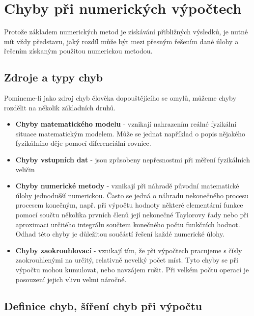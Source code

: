 {  %
  \section{Chyby při numerických výpočtech}
    Protože základem numerických metod je získávání přibližných výsledků, je nutné mít vždy
    představu, jaký rozdíl může být mezi přesným řešením dané úlohy a řešením získaným použitou
    numerickou metodou.
    \subsection{Zdroje a typy chyb}
      Pomineme-li jako zdroj chyb člověka dopouštějícího se omylů, můžeme chyby rozdělit na několik
      základních druhů.
      \begin{itemize}
        \item \textbf{Chyby matematického modelu} - vznikají nahrazením reálné fyzikální situace
              matematickým modelem. Může se jednat například o popis nějakého fyzikálního děje 
              pomocí diferenciální rovnice.
        \item \textbf{Chyby vstupních dat} - jsou způsobeny nepřesnostmi při měření fyzikálních
              veličin
        \item \textbf{Chyby numerické metody} - vznikají při náhradě původní matematické úlohy
              jednodušší numerickou. Často se jedná o náhradu nekonečného procesu procesem konečným,
              např. při výpočtu hodnoty některé elementární funkce pomocí součtu několika prvních
              členů její nekonečné Taylorovy řady nebo při aproximaci určitého integrálu souč\-tem
              konečného počtu funkčních hodnot. Odhad této chyby je důležitou součástí řešení každé
              numerické úlohy.
        \item \textbf{Chyby zaokrouhlovací} - vznikají tím, že při výpočtech pracujeme s čísly
              zaokrouhlenými na určitý, relativně nevelký počet míst. Tyto chyby se při výpočtu 
              mohou kumulovat, nebo navzájem rušit. Při vel\-kém počtu operací je posouzení jejich 
              vlivu velmi náročné.
      \end{itemize}
      
    \subsection{Definice chyb, šíření chyb při výpočtu}
}
